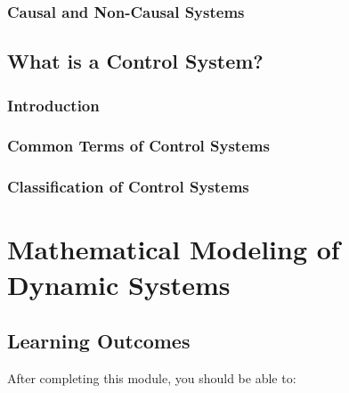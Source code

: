 \documentclass[
  14pt,
  a4paper,
  oneside,
  open=any,
  a4paper,
  14pt]{report}
\begin{document}
\subsection{Causal and Non-Causal
Systems}\label{causal-and-non-causal-systems}

\section{What is a Control System?}\label{what-is-a-control-system}

\subsection{Introduction}\label{introduction-3}

\subsection{Common Terms of Control
Systems}\label{common-terms-of-control-systems}

\subsection{Classification of Control
Systems}\label{classification-of-control-systems}

\chapter{Mathematical Modeling of Dynamic
Systems}\label{mathematical-modeling-of-dynamic-systems}

\section*{Learning Outcomes}\label{learning-outcomes-1}


After completing this module, you should be able to:
\end{document}
